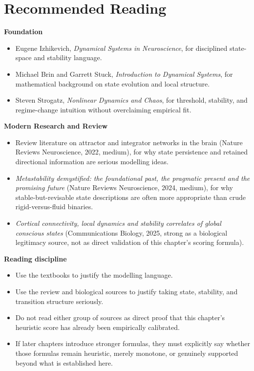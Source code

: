 \section{Recommended Reading}

\begin{readingbox}
\textbf{Foundation}
\begin{itemize}[nosep]
  \item Eugene Izhikevich, \emph{Dynamical Systems in Neuroscience}, for
        disciplined state-space and stability language.
  \item Michael Brin and Garrett Stuck, \emph{Introduction to Dynamical
        Systems}, for mathematical background on state evolution and local
        structure.
  \item Steven Strogatz, \emph{Nonlinear Dynamics and Chaos}, for threshold,
        stability, and regime-change intuition without overclaiming empirical
        fit.
\end{itemize}
\textbf{Modern Research and Review}
\begin{itemize}[nosep]
  \item Review literature on attractor and integrator networks in the brain
        (Nature Reviews Neuroscience, 2022, medium), for why state persistence
        and retained directional information are serious modelling ideas.
  \item \emph{Metastability demystified: the foundational past, the pragmatic
        present and the promising future} (Nature Reviews Neuroscience, 2024,
        medium), for why stable-but-revisable state descriptions are often more
        appropriate than crude rigid-versus-fluid binaries.
  \item \emph{Cortical connectivity, local dynamics and stability correlates of
        global conscious states} (Communications Biology, 2025, strong as a
        biological legitimacy source, not as direct validation of this
        chapter's scoring formula).
\end{itemize}
\textbf{Reading discipline}
\begin{itemize}[nosep]
  \item Use the textbooks to justify the modelling language.
  \item Use the review and biological sources to justify taking state,
        stability, and transition structure seriously.
  \item Do not read either group of sources as direct proof that this chapter's
        heuristic score has already been empirically calibrated.
  \item If later chapters introduce stronger formulas, they must explicitly say
        whether those formulas remain heuristic, merely monotone, or genuinely
        supported beyond what is established here.
\end{itemize}
\end{readingbox}

